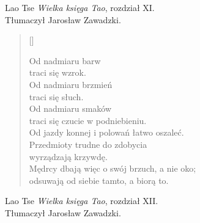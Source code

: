 \documentclass[a4paper,11pt]{article}
\newcommand{\attribB}[1]{#1}
\begin{document}
\attribB{Lao Tse \emph{Wielka księga Tao}, rozdział XI. \\
  Tłumaczył Jarosław Zawadzki.}

\vspace{\spaceThree}



\settowidth{\versewidth}{Od jazdy konnej i polowań łatwo oszaleć.}

\begin{verse}[\versewidth]

  Od nadmiaru barw \\
  traci się wzrok. \\
  Od nadmiaru brzmień \\
  traci się słuch. \\
  Od nadmiaru smaków \\
  traci się czucie w podniebieniu. \\
  Od jazdy konnej i polowań łatwo oszaleć. \\
  Przedmioty trudne do zdobycia \\
  wyrządzają krzywdę. \\
  Mędrcy dbają więc o swój brzuch, a nie oko; \\
  odsuwają od siebie tamto, a biorą to.

\end{verse}


\attribB{Lao Tse \emph{Wielka księga Tao}, rozdział XII. \\
  Tłumaczył Jarosław Zawadzki.}

\vspace{\spaceThree}



\settowidth{\versewidth}{Co to znaczy, że „zaszczyt i~hańba taką samą
  napełniają trwogą”?}
\end{document}
